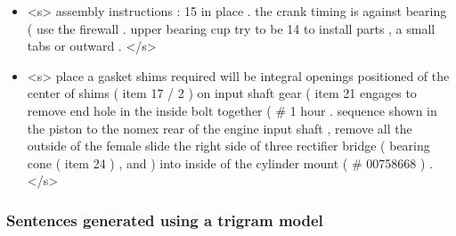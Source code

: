 \begin{itemize}
	\item <s> assembly instructions : 15 in place . the crank timing is against bearing ( use the firewall . upper bearing cup try to be 14 to install parts , a small tabs or outward . </s>
	\item <s> place a gasket shims required will be integral openings positioned of the center of shims ( item 17 / 2 ) on input shaft gear ( item 21 engages to remove end hole in the inside bolt together ( \# 1 hour . sequence shown in the piston to the nomex rear of the engine input shaft , remove all the outside of the female slide the right side of three rectifier bridge ( bearing cone ( item 24 ) , and ) into inside of the cylinder mount ( \# 00758668 ) . </s>
\end{itemize}


\subsubsection{Sentences generated using a trigram model}\label{subsec:trigram-sentences}

